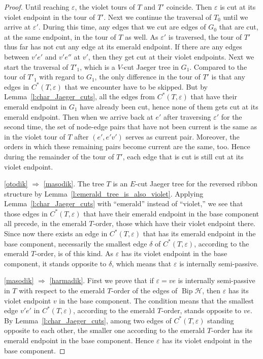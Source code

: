 \documentclass[10pt]{amsart}
\theoremstyle{definition}\newtheorem{defi}[theo]{Definition}
\theoremstyle{remark}\newtheorem{rema}[theo]{Remark}
\newcommand{\HH}{\mathcal H}
\DeclareMathOperator{\Bip}{Bip}
\begin{document}
\begin{proof}
Until reaching $\varepsilon$, the violet tours of $T$ and $T'$ coincide. Then $\varepsilon$ is cut at its violet endpoint in the tour of $T'$. Next we continue the traversal of $T_0$ until we arrive at $\varepsilon'$. During this time, any edges that we cut are edges of $G_0$ that are cut, at the same endpoint, in the tour of $T$ as well. As $\varepsilon'$ is traversed, the tour of $T'$ thus far has not cut any edge at its emerald endpoint. If there are any edges between $v'e'$ and $v'e''$ at $v'$, then they get cut at their violet endpoints. Next we start the traversal of $T'_1$, which is a $V$-cut Jaeger tree in $G_1$. Compared to the tour of $T'_1$ with regard to $G_1$, the only difference in the tour of $T'$ is that any edges in $C^*(T,\varepsilon)$ that we encounter have to be skipped. But by Lemma~\ref{l:char_Jaeger_cuts}, all the edges from $C^*(T,\varepsilon)$ that have their emerald endpoint in $G_1$ have already been cut, hence none of them gets cut at its emerald endpoint. Then when we arrive back at $e'$ after traversing $\varepsilon'$ for the second time, the set of node-edge pairs that have not been current is the same as in the violet tour of $T$ after $(e',e'v')$ serves as current pair. Moreover, the orders in which these remaining pairs become current are the same, too. Hence during the remainder of the tour of $T'$, each edge that is cut is still cut at its violet endpoint.


\ref{otodik} $\Rightarrow$ \ref{masodik}. The tree $T$ is an $E$-cut Jaeger tree for the reversed ribbon structure by Lemma~\ref{l:emerald_tree_is_also_violet}. Applying Lemma~\ref{l:char_Jaeger_cuts} with ``emerald'' instead of ``violet,'' we see that those edges in $C^*(T,\varepsilon)$ that have their emerald endpoint in the base component all precede, in the emerald $T$-order, those which have their violet endpoint there. Since now there exists an edge in $C^*(T,\varepsilon)$ that has its emerald endpoint in the base component, necessarily the smallest edge $\delta$ of $C^*(T,\varepsilon)$, according to the emerald $T$-order, is of this kind. As $\varepsilon$ has its violet endpoint in the base component, it stands opposite to $\delta$, which means that $\varepsilon$ is internally semi-passive.


\ref{masodik} $\Rightarrow$ \ref{harmadik}. First we prove that if $\varepsilon=ve$ is internally semi-passive in $T$ with respect to the emerald $T$-order of the edges of $\Bip \HH$, then $\varepsilon$ has its violet endpoint $v$ in the base component. The condition means that the smallest edge $v'e'$ in $C^*(T,\varepsilon)$, according to the emerald $T$-order, stands opposite to $ve$. By Lemma~\ref{l:char_Jaeger_cuts}, among two edges of $C^*(T,\varepsilon)$ standing opposite to each other, the smaller one according to the emerald $T$-order has its emerald endpoint in the base component. Hence $\varepsilon$ has its violet endpoint in the base component.


\end{proof}
\end{document}
